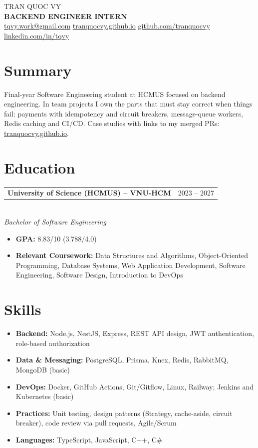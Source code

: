 \documentclass[11pt,a4paper]{article}
\makeatletter
\newcommand{\entry}[3]{%
  \begin{tabularx}{\linewidth}{@{}X r@{}}
    \textbf{#1} & #2 \\
  \end{tabularx}\\[-2pt]
  {\itshape #3}\par
}
\makeatother
\begin{document}
\begin{center}
  {\fontsize{24}{28}\selectfont TRAN QUOC VY}\\[3pt]
  {\large\bfseries BACKEND ENGINEER INTERN}\\[4pt]
  {\small \href{mailto:tqvy.work@gmail.com}{tqvy.work@gmail.com} \textbar{}
  \ifdefined\PublicVersion\else\ifdefined\CVPhone \CVPhone{} \textbar{} \fi\fi
  \href{https://tranquocvy.github.io}{tranquocvy.github.io} \textbar{}
  \href{https://github.com/tranquocvy}{github.com/tranquocvy} \textbar{}
  \href{https://www.linkedin.com/in/tqvy/}{linkedin.com/in/tqvy}}
\end{center}
\vspace{-4pt}

\section{Summary}
Final-year Software Engineering student at HCMUS focused on backend engineering. In team projects I own the
parts that must stay correct when things fail: payments with idempotency and circuit breakers, message-queue
workers, Redis caching and CI/CD. Case studies with links to my merged PRs:
\href{https://tranquocvy.github.io}{tranquocvy.github.io}.

\section{Education}
\entry{University of Science (HCMUS) -- VNU-HCM}{2023 -- 2027}{Bachelor of Software Engineering}
\begin{itemize}
  \item \textbf{GPA:} 8.83/10 (3.788/4.0)
  \item \textbf{Relevant Coursework:} Data Structures and Algorithms, Object-Oriented Programming, Database Systems,
        Web Application Development, Software Engineering, Software Design, Introduction to DevOps
\end{itemize}

\section{Skills}
\begin{itemize}
  \item \textbf{Backend:} Node.js, NestJS, Express, REST API design, JWT authentication, role-based authorization
  \item \textbf{Data \& Messaging:} PostgreSQL, Prisma, Knex, Redis, RabbitMQ, MongoDB (basic)
  \item \textbf{DevOps:} Docker, GitHub Actions, Git/Gitflow, Linux, Railway; Jenkins and Kubernetes (basic)
  \item \textbf{Practices:} Unit testing, design patterns (Strategy, cache-aside, circuit breaker), code review via pull requests, Agile/Scrum
  \item \textbf{Languages:} TypeScript, JavaScript, C++, C\#
\end{itemize}
\end{document}
